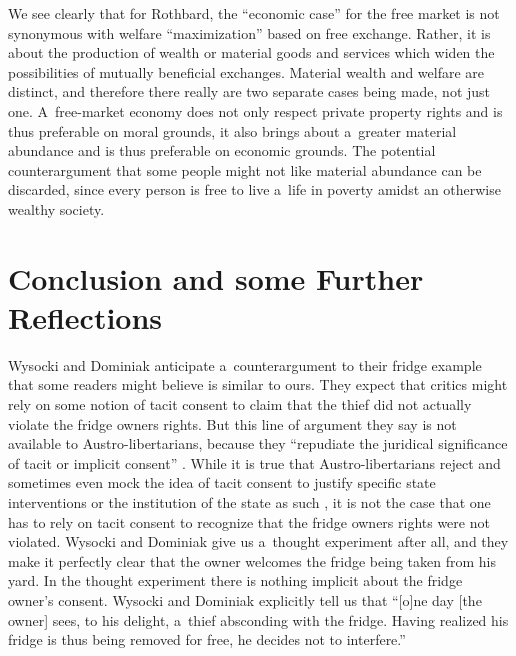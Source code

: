 We see clearly that for Rothbard, the ``economic case'' for the free market is not synonymous with welfare ``maximization'' based on free exchange. Rather, it is about the production of wealth or material goods and services which widen the possibilities of mutually beneficial exchanges. Material wealth and welfare are distinct, and therefore there really are two separate cases being made, not just one. A~free-market economy does not only respect private property rights and is thus preferable on moral grounds, it also brings about a~greater material abundance and is thus preferable on economic grounds. The potential counterargument that some people might not like material abundance can be discarded, since every person is free to live a~life in poverty amidst an otherwise wealthy society.



\section{Conclusion and some Further Reflections}

Wysocki and Dominiak 
\parencite*[][pp.58–59]{wysocki_how_2023} %
 anticipate a~counterargument to their fridge example that some readers might believe is similar to ours. They expect that critics might rely on some notion of tacit consent to claim that the thief did not actually violate the fridge owners rights. But this line of argument they say is not available to Austro-libertarians, because they ``repudiate the juridical significance of tacit or implicit consent'' 
\parencite[][p.58]{wysocki_how_2023}. %
 While it is true that Austro-libertarians reject and sometimes even mock the idea of tacit consent to justify specific state interventions or the institution of the state as such 
\parencite[][]{hoppe_economics_2006}, %
 it is not the case that one has to rely on tacit consent to recognize that the fridge owners rights were not violated. Wysocki and Dominiak give us a~thought experiment after all, and they make it perfectly clear that the owner welcomes the fridge being taken from his yard. In the thought experiment there is nothing implicit about the fridge owner's consent. Wysocki and Dominiak 
\parencite*[][p.58]{wysocki_how_2023} %
 explicitly tell us that ``[o]ne day [the owner] sees, to his delight, a~thief absconding with the fridge. Having realized his fridge is thus being removed for free, he decides not to interfere.''




